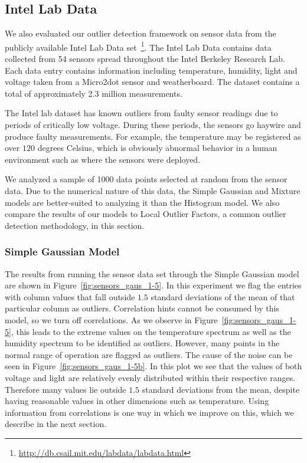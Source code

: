 \subsection{Intel Lab Data}
\label{sec:intel-lab-data-evaluation}

We also evaluated our outlier detection framework on sensor data from the publicly available Intel Lab Data set~\footnote{\url{http://db.csail.mit.edu/labdata/labdata.html}}. The Intel Lab Data contains data collected from 54 sensors spread throughout the Intel Berkeley Research Lab. Each data entry contains information including temperature, humidity, light and voltage taken from a Micro2dot sensor and weatherboard. The dataset contains a total of approximately 2.3 million measurements.

The Intel lab dataset has known outliers from faulty sensor readings due to periods of critically low voltage. During these periods, the sensors go haywire and produce faulty measurements.
For example, the temperature may be registered as over $120$ degrees Celsius, which is obviously abnormal behavior in a human environment such as where the sensors were deployed.
 
We analyzed a sample of 1000 data points selected at random from the sensor data. 
Due to the numerical nature of this data, the Simple Gaussian and Mixture models are better-suited to analyzing it than the Histogram model.
We also compare the results of our models to Local Outlier Factors, a common outlier detection methodology, in this section.
 
\subsubsection{Simple Gaussian Model}

The results from running the sensor data set through the Simple Gaussian model are shown in Figure~\ref{fig:sensors_gaus_1-5}.
In this experiment we flag the entries with column values that fall outside $1.5$ standard deviations of the mean of that particular column as outliers.
Correlation hints cannot be consumed by this model, so we turn off correlations.
As we observe in Figure~\ref{fig:sensors_gaus_1-5}, this leads to the extreme values on the temperature spectrum as well as the humidity spectrum to be identified as outliers.
However, many points in the normal range of operation are flagged as outliers.
The cause of the noise can be seen in Figure~\ref{fig:sensors_gaus_1-5b}.
In this plot we see that the values of both voltage and light are relatively evenly distributed within their respective ranges.
Therefore many values lie outside $1.5$ standard deviations from the mean, despite having reasonable values in other dimensions such as temperature.
Using information from correlations is one way in which we improve on this, which we describe in the next section.

